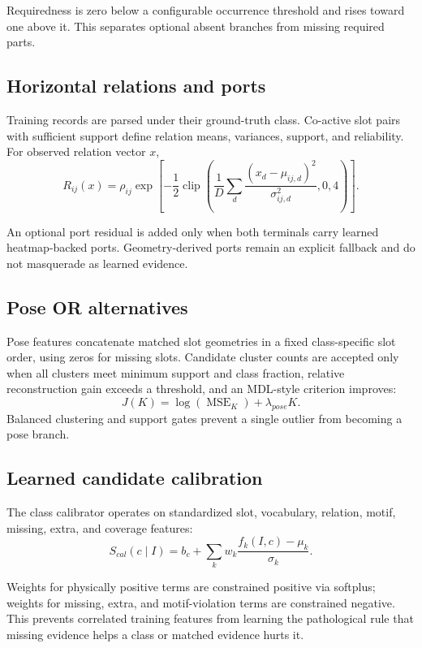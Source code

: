\documentclass[11pt]{article}
\begin{document}
Requiredness is zero below a configurable occurrence threshold and rises toward
one above it. This separates optional absent branches from missing required parts.

\subsection{Horizontal relations and ports}

Training records are parsed under their ground-truth class. Co-active slot pairs
with sufficient support define relation means, variances, support, and reliability.
For observed relation vector $x$,
\[
R_{ij}(x)=\rho_{ij}\exp\left[
-\frac{1}{2}\operatorname{clip}\left(
\frac{1}{D}\sum_d\frac{(x_d-\mu_{ij,d})^2}{\sigma^2_{ij,d}},0,4
\right)\right].
\]

An optional port residual is added only when both terminals carry learned
heatmap-backed ports. Geometry-derived ports remain an explicit fallback and do
not masquerade as learned evidence.

\subsection{Pose OR alternatives}

Pose features concatenate matched slot geometries in a fixed class-specific slot
order, using zeros for missing slots. Candidate cluster counts are accepted only
when all clusters meet minimum support and class fraction, relative reconstruction
gain exceeds a threshold, and an MDL-style criterion improves:
\[
J(K)=\log(\operatorname{MSE}_K)+\lambda_{pose}K.
\]
Balanced clustering and support gates prevent a single outlier from becoming a
pose branch.

\subsection{Learned candidate calibration}

The class calibrator operates on standardized slot, vocabulary, relation, motif,
missing, extra, and coverage features:
\[
S_{cal}(c\mid I)=b_c+\sum_k w_k
\frac{f_k(I,c)-\mu_k}{\sigma_k}.
\]

Weights for physically positive terms are constrained positive via softplus;
weights for missing, extra, and motif-violation terms are constrained negative.
This prevents correlated training features from learning the pathological rule
that missing evidence helps a class or matched evidence hurts it.
\end{document}
